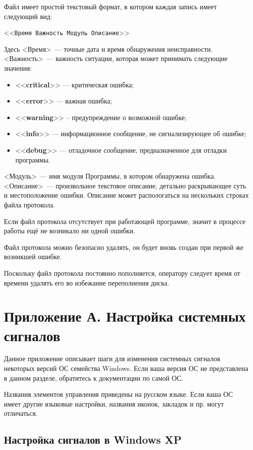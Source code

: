 \documentclass[12pt, a4paper, twocolumn]{report}
\newcommand{\CTL}[1]{<<{\bf #1}>>}
\newcommand{\CMD}[1]{<<{\tt #1}>>}
\begin{document}
Файл имеет простой текстовый формат, в котором каждая запись имеет следующий вид:

\CMD{Время Важность Модуль Описание}

Здесь <Время>~--- точные дата и время обнаружения неисправности. <Важность>~--- важность ситуации, которая может принимать следующие значения:

\begin{itemize}
\item \CTL{critical} --- критическая ошибка;
\item \CTL{error} --- важная ошибка;
\item \CTL{warning} -- предупреждение о возможной ошибке;
\item \CTL{info} --- информационное сообщение, не сигнализирующее об ошибке;
\item \CTL{debug} --- отладочное сообщение, предназначенное для отладки программы.
\end{itemize}

<Модуль>~--- имя модуля Программы, в котором обнаружена ошибка. <Описание>~--- произвольное текстовое описание, детально раскрывающее суть и местоположение ошибки. Описание может распологаться на нескольких строках файла протокола.

Если файл протокола отсутствует при работающей программе, значит в процессе работы ещё не возникало ни одной ошибки.

Файл протокола можно безопасно удалять, он будет вновь создан при первой же возникшей ошибке.

Поскольку файл протокола постоянно пополняется, оператору следует время от времени удалять его во избежание переполнения диска.

\chapter*{Приложение А. Настройка системных сигналов}
\label{sec_system_sounds}

Данное приложение описывает шаги для изменения системных сигналов некоторых версий ОС семейства Windows. Если ваша версия ОС не представлена в данном разделе, обратитесь к документации по самой ОС.

Названия элементов управления приведены на русском языке. Если ваша ОС имеет другие языковые настройки, названия иконок, закладок и пр. могут отличаться.

\section*{Настройка сигналов в Windows XP}
\end{document}
